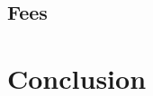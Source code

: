 \documentclass[11pt,a4paper]{article}
\begin{document}

\subsection{Fees}

\pagebreak

\section{Conclusion}

\pagebreak

\printglossaries
\end{document}
